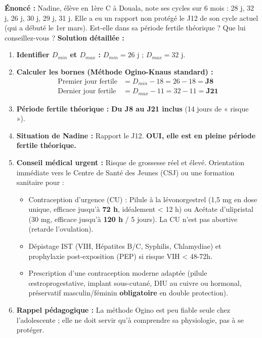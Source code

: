 \documentclass[11pt]{article}
\begin{document}
\begin{exoresolu}
\textbf{Énoncé :} Nadine, élève en 1ère C à Douala, note ses cycles sur 6 mois : 28 j, 32 j, 26 j, 30 j, 29 j, 31 j. Elle a eu un rapport non protégé le J12 de son cycle actuel (qui a débuté le 1er mars). Est-elle dans sa période fertile théorique ? Que lui conseillez-vous ?
\textbf{Solution détaillée :}
\begin{enumerate}
    \item \textbf{Identifier $D_{min}$ et $D_{max}$ :} $D_{min} = 26$ j ; $D_{max} = 32$ j.
    \item \textbf{Calculer les bornes (Méthode Ogino-Knaus standard) :}
    \begin{align*}
        \text{Premier jour fertile} &= D_{min} - 18 = 26 - 18 = \textbf{J8} \\
        \text{Dernier jour fertile} &= D_{max} - 11 = 32 - 11 = \textbf{J21}
    \end{align*}
    \item \textbf{Période fertile théorique :} \textbf{Du J8 au J21 inclus} (14 jours de « risque »).
    \item \textbf{Situation de Nadine :} Rapport le J12. \textbf{OUI, elle est en pleine période fertile théorique.}
    \item \textbf{Conseil médical urgent :} Risque de grossesse réel et élevé. Orientation immédiate vers le Centre de Santé des Jeunes (CSJ) ou une formation sanitaire pour :
    \begin{itemize}
        \item Contraception d'urgence (CU) : Pilule à la lévonorgestrel (1,5 mg en dose unique, efficace jusqu'à \textbf{72 h}, idéalement < 12 h) ou Acétate d'ulipristal (30 mg, efficace jusqu'à \textbf{120 h} / 5 jours). La CU n'est pas abortive (retarde l'ovulation).
        \item Dépistage IST (VIH, Hépatites B/C, Syphilis, Chlamydiae) et prophylaxie post-exposition (PEP) si risque VIH < 48-72h.
        \item Prescription d'une contraception moderne adaptée (pilule œstroprogestative, implant sous-cutané, DIU au cuivre ou hormonal, préservatif masculin/féminin \textbf{obligatoire} en double protection).
    \end{itemize}
    \item \textbf{Rappel pédagogique :} La méthode Ogino est peu fiable seule chez l'adolescente ; elle ne doit servir qu'à comprendre sa physiologie, pas à se protéger.
\end{enumerate}
\end{exoresolu}
\end{document}
